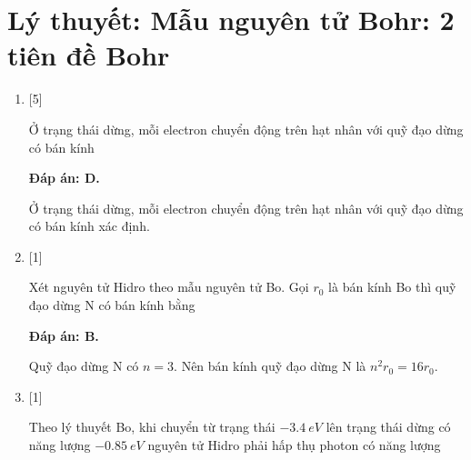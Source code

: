\whiteBGstarBegin
\setcounter{section}{0}
\section{Lý thuyết: Mẫu nguyên tử Bohr: 2 tiên đề Bohr}
\begin{enumerate}[label=\bfseries Câu \arabic*:]

		\item {} [5]
	
		\cauhoi
		{Ở trạng thái dừng, mỗi electron chuyển động trên hạt nhân với quỹ đạo dừng có bán kính
		}
	
		\loigiai
		{		\textbf{Đáp án: D.}

Ở trạng thái dừng, mỗi electron chuyển động trên hạt nhân với quỹ đạo dừng có bán kính xác định.		
		}

		\item {} 
	
		\cauhoi
		{Xét nguyên tử Hidro theo mẫu nguyên tử Bo. Gọi $ r_{0} $ là bán kính Bo thì quỹ đạo dừng N có bán kính bằng
		}
	
		\loigiai
		{		\textbf{Đáp án: B.}	
		
Quỹ đạo dừng N có $ n = 3 $. Nên bán kính quỹ đạo dừng N là $ n^{2} r_{0} = 16 r_{0} $.
		}
		
		\item {} [1]
	
		\cauhoi
		{Theo lý thuyết Bo, khi chuyển từ trạng thái $ \SI{-3,4}{eV} $ lên trạng thái dừng có năng lượng $ \SI{-0,85}{eV} $ nguyên tử Hidro phải hấp thụ photon có năng lượng
		}
	

\end{enumerate}
